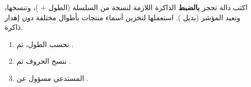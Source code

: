 \begin{statement}
اكتب دالة  تحجز \textbf{بالضبط} الذاكرة اللازمة لنسخة من السلسلة (الطول + )، وتنسخها، وتعيد المؤشر (بديل ). استعملها لتخزين أسماء منتجات بأطوال مختلفة دون إهدار ذاكرة.
\end{statement}
\begin{stepsbox}\begin{enumerate}
\item نحسب الطول، ثم .
\item ننسخ الحروف ثم .
\item المستدعي مسؤول عن .
\end{enumerate}\end{stepsbox}
